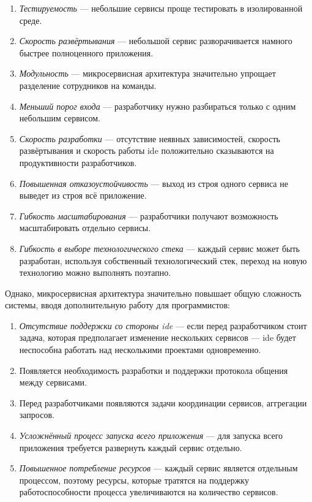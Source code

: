\begin{enumerate}
	\item \emph{Тестируемость} --- небольшие сервисы проще тестировать в изолированной среде.
	\item \emph{Скорость развёртывания} --- небольшой сервис разворачивается намного быстрее полноценного приложения.
	\item \emph{Модульность} --- микросервисная архитектура значительно упрощает разделение сотрудников на команды.
	\item \emph{Меньший порог входа} --- разработчику нужно разбираться только с одним небольшим сервисом.
	\item \emph{Скорость разработки} --- отсутствие неявных зависимостей, скорость развёртывания и скорость работы \gls{ide} положительно сказываются на продуктивности разработчиков.
	\item \emph{Повышенная отказоустойчивость} --- выход из строя одного сервиса не выведет из строя всё приложение.
	\item \emph{Гибкость масштабирования} --- разработчики получают возможность масштабировать отдельно сервисы.
	\item \emph{Гибкость в выборе технологического стека} --- каждый сервис может быть разработан, используя собственный технологический стек, переход на новую технологию можно выполнять поэтапно.
\end{enumerate}

Однако, микросервисная архитектура значительно повышает общую сложность системы, вводя дополнительную работу для программистов:

\begin{enumerate}
	\item \emph{Отсутствие поддержки со стороны \gls{ide}} --- если перед разработчиком стоит задача, которая предполагает изменение нескольких сервисов --- \gls{ide} будет неспособна работать над несколькими проектами одновременно.
	\item Появляется необходимость разработки и поддержки протокола общения между сервисами.
	\item Перед разработчиками появляются задачи координации сервисов, аггрегации запросов.
	\item \emph{Усложнённый процесс запуска всего приложения} --- для запуска всего приложения требуется развернуть каждый сервис отдельно.
	\item \emph{Повышенное потребление ресурсов} --- каждый сервис является отдельным процессом, поэтому ресурсы, которые тратятся на поддержку работоспособности процесса увеличиваются на количество сервисов.
\end{enumerate}


